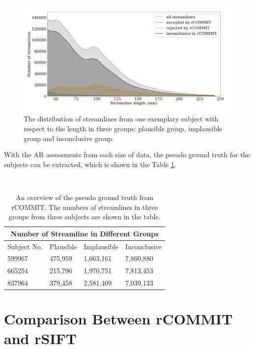 \begin{figure}[ht]
    \centering
    \includegraphics[width= 12cm]{figures/three_groups_hist.png}
        \caption{The distribution of streamlines from one exemplary subject with respect to the length in three groups: plausible group, implausible group and inconclusive group. }
    \label{fig:threegroup}
\end{figure}


With the AR assessments from each size of data, 
the pseudo ground truth for the subjects can be extracted, which is shown in the Table \ref{table:pgt}.



\begin{table}[!ht]
    \centering
    \caption{An overview of the pseudo ground truth from rCOMMIT. The numbers of streamlines in three groups from three subjects are shown in the table. }
    ~\\
    \label{table:pgt}
    \begin{tabular}{p{3cm}|p{3cm}|p{3cm}|p{3cm}}
    \toprule
    \multicolumn{4}{c}{\textbf{Number of Streamline in Different Groups}} \\
    \toprule
    Subject No. & Plausible &Implausible & Inconclusive \\
    \hline
    599967 & 475,959 &1,663,161 & 7,860,880 \\
    \hline
    665254 & 215,796 &1,970,751 & 7,813,453 \\
    \hline
    837964 & 379,458 &2,581,409 & 7,039,133 \\
    \bottomrule
    \end{tabular}
\end{table}

\section{Comparison Between rCOMMIT and rSIFT}



